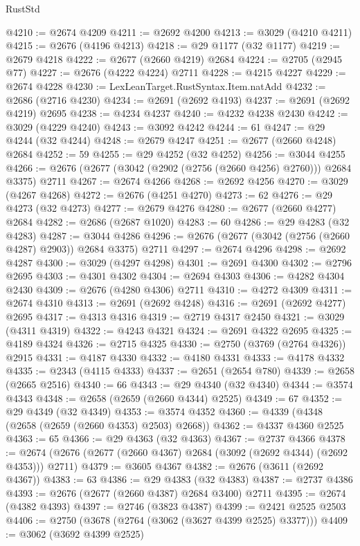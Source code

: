 \begin{lexlean}{RustStd}
\begin{coremodule}
@4210 := @2674 @4209
@4211 := @2692 @4200
@4213 := @3029 (@4210 @4211)
@4215 := @2676 (@4196 @4213)
@4218 := @29 @1177 (@32 @1177)
@4219 := @2679 @4218
@4222 := @2677 (@2660 @4219) @2684
@4224 := @2705 (@2945 @77)
@4227 := @2676 (@4222 @4224) @2711
@4228 := @4215 @4227
@4229 := @2674 @4228
@4230 := LexLeanTarget.RustSyntax.Item.natAdd
@4232 := @2686 (@2716 @4230)
@4234 := @2691 (@2692 @4193)
@4237 := @2691 (@2692 @4219) @2695
@4238 := @4234 @4237
@4240 := @4232 @4238 @2430
@4242 := @3029 (@4229 @4240)
@4243 := @3092 @4242
@4244 := 61
@4247 := @29 @4244 (@32 @4244)
@4248 := @2679 @4247
@4251 := @2677 (@2660 @4248) @2684
@4252 := 59
@4255 := @29 @4252 (@32 @4252)
@4256 := @3044 @4255
@4266 := @2676 (@2677 (@3042 (@2902 (@2756 (@2660 @4256) @2760))) @2684 @3375) @2711
@4267 := @2674 @4266
@4268 := @2692 @4256
@4270 := @3029 (@4267 @4268)
@4272 := @2676 (@4251 @4270)
@4273 := 62
@4276 := @29 @4273 (@32 @4273)
@4277 := @2679 @4276
@4280 := @2677 (@2660 @4277) @2684
@4282 := @2686 (@2687 @1020)
@4283 := 60
@4286 := @29 @4283 (@32 @4283)
@4287 := @3044 @4286
@4296 := @2676 (@2677 (@3042 (@2756 (@2660 @4287) @2903)) @2684 @3375) @2711
@4297 := @2674 @4296
@4298 := @2692 @4287
@4300 := @3029 (@4297 @4298)
@4301 := @2691 @4300
@4302 := @2796 @2695
@4303 := @4301 @4302
@4304 := @2694 @4303
@4306 := @4282 @4304 @2430
@4309 := @2676 (@4280 @4306) @2711
@4310 := @4272 @4309
@4311 := @2674 @4310
@4313 := @2691 (@2692 @4248)
@4316 := @2691 (@2692 @4277) @2695
@4317 := @4313 @4316
@4319 := @2719 @4317 @2450
@4321 := @3029 (@4311 @4319)
@4322 := @4243 @4321
@4324 := @2691 @4322 @2695
@4325 := @4189 @4324
@4326 := @2715 @4325
@4330 := @2750 (@3769 (@2764 @4326)) @2915
@4331 := @4187 @4330
@4332 := @4180 @4331
@4333 := @4178 @4332
@4335 := @2343 (@4115 @4333)
@4337 := @2651 (@2654 @780)
@4339 := @2658 (@2665 @2516)
@4340 := 66
@4343 := @29 @4340 (@32 @4340)
@4344 := @3574 @4343
@4348 := @2658 (@2659 (@2660 @4344) @2525)
@4349 := 67
@4352 := @29 @4349 (@32 @4349)
@4353 := @3574 @4352
@4360 := @4339 (@4348 (@2658 (@2659 (@2660 @4353) @2503) @2668))
@4362 := @4337 @4360 @2525
@4363 := 65
@4366 := @29 @4363 (@32 @4363)
@4367 := @2737 @4366
@4378 := @2674 (@2676 (@2677 (@2660 @4367) @2684 (@3092 (@2692 @4344) (@2692 @4353))) @2711)
@4379 := @3605 @4367
@4382 := @2676 (@3611 (@2692 @4367))
@4383 := 63
@4386 := @29 @4383 (@32 @4383)
@4387 := @2737 @4386
@4393 := @2676 (@2677 (@2660 @4387) @2684 @3400) @2711
@4395 := @2674 (@4382 @4393)
@4397 := @2746 (@3823 @4387)
@4399 := @2421 @2525 @2503
@4406 := @2750 (@3678 (@2764 (@3062 (@3627 @4399 @2525) @3377)))
@4409 := @3062 (@3692 @4399 @2525)

\end{coremodule}
\end{lexlean}
